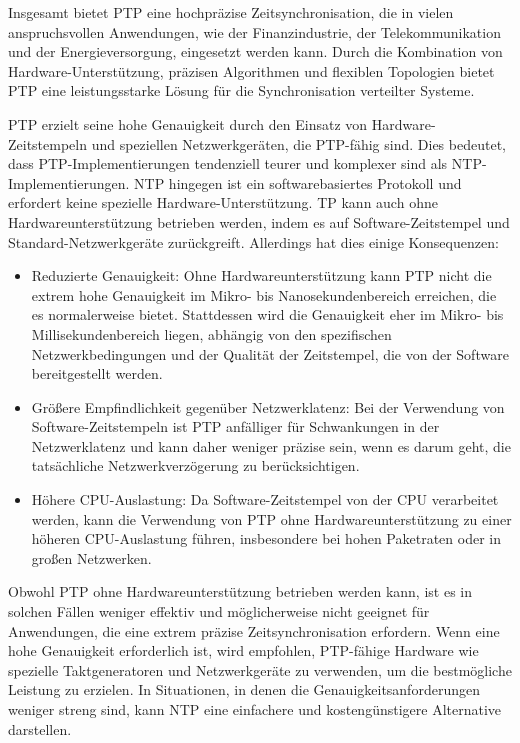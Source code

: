 Insgesamt bietet PTP eine hochpräzise Zeitsynchronisation, die in vielen anspruchsvollen Anwendungen, wie der Finanzindustrie, der Telekommunikation und der Energieversorgung, eingesetzt werden kann. Durch die Kombination von Hardware-Unterstützung, präzisen Algorithmen und flexiblen Topologien bietet PTP eine leistungsstarke Lösung für die Synchronisation verteilter Systeme.

PTP erzielt seine hohe Genauigkeit durch den Einsatz von Hardware-Zeitstempeln und speziellen Netzwerkgeräten, die PTP-fähig sind. Dies bedeutet, dass PTP-Implementierungen tendenziell teurer und komplexer sind als NTP-Implementierungen. NTP hingegen ist ein softwarebasiertes Protokoll und erfordert keine spezielle Hardware-Unterstützung.
TP kann auch ohne Hardwareunterstützung betrieben werden, indem es auf Software-Zeitstempel und Standard-Netzwerkgeräte zurückgreift. Allerdings hat dies einige Konsequenzen:
\begin{itemize}
\item Reduzierte Genauigkeit: Ohne Hardwareunterstützung kann PTP nicht die extrem hohe Genauigkeit im Mikro- bis Nanosekundenbereich erreichen, die es normalerweise bietet. Stattdessen wird die Genauigkeit eher im Mikro- bis Millisekundenbereich liegen, abhängig von den spezifischen Netzwerkbedingungen und der Qualität der Zeitstempel, die von der Software bereitgestellt werden.
\item Größere Empfindlichkeit gegenüber Netzwerklatenz: Bei der Verwendung von Software-Zeitstempeln ist PTP anfälliger für Schwankungen in der Netzwerklatenz und kann daher weniger präzise sein, wenn es darum geht, die tatsächliche Netzwerkverzögerung zu berücksichtigen.
\item Höhere CPU-Auslastung: Da Software-Zeitstempel von der CPU verarbeitet werden, kann die Verwendung von PTP ohne Hardwareunterstützung zu einer höheren CPU-Auslastung führen, insbesondere bei hohen Paketraten oder in großen Netzwerken.
\end{itemize}
Obwohl PTP ohne Hardwareunterstützung betrieben werden kann, ist es in solchen Fällen weniger effektiv und möglicherweise nicht geeignet für Anwendungen, die eine extrem präzise Zeitsynchronisation erfordern. Wenn eine hohe Genauigkeit erforderlich ist, wird empfohlen, PTP-fähige Hardware wie spezielle Taktgeneratoren und Netzwerkgeräte zu verwenden, um die bestmögliche Leistung zu erzielen. In Situationen, in denen die Genauigkeitsanforderungen weniger streng sind, kann NTP eine einfachere und kostengünstigere Alternative darstellen.

